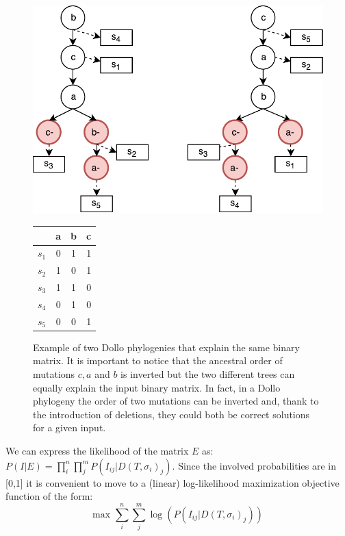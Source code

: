 \documentclass[a4paper,USenglish]{article}
\theoremstyle{definition}
\begin{document}
\begin{figure}[!tb]
  \begin{minipage}{0.72\linewidth}
    \includegraphics[scale=.65]{img/dollo_non_unique}
\end{minipage}
\begin{minipage}{0.2\linewidth}
    \begin{tabular}[!t]{c|ccc}
            & a & b & c \\ \hline
            $s_1$ & 0 & 1 & 1 \\
            $s_2$ & 1 & 0 & 1 \\
            $s_3$ & 1 & 1 & 0 \\
            $s_4$ & 0 & 1 & 0 \\
            $s_5$ & 0 & 0 & 1
\end{tabular}
\end{minipage}
\caption{Example of two Dollo phylogenies that explain the same binary matrix. 
It is important to notice that the ancestral order of mutations $c,a$ and $b$ is inverted but the two different trees can equally explain the input binary matrix. In fact, in a Dollo phylogeny the order of two mutations can be inverted and, thank to the introduction of deletions, they could both be correct solutions for a given input.
}
\label{fig:dollo_non_unique}
\end{figure}

We can express the likelihood of the matrix $E$ as: $P(I|E) = \prod_{i}^{n} \prod_{j}^{m} P(I_{ij} | D(T, \sigma_i)_j)$.
Since the involved probabilities are in [0,1] it is convenient to move to a (linear) log-likelihood maximization objective function of the form:
\begin{equation}
\label{eq:log-likelihood}
    \mbox{max } \sum_i^n \sum_j^m \log(P( I_{ij}| D(T, \sigma_i)_j))
\end{equation}
\end{document}
